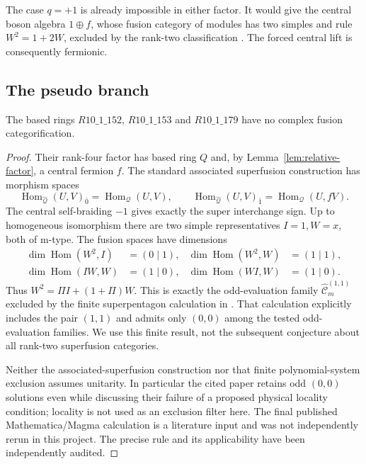 The case $q=+1$ is already impossible in either factor. It would give
the central boson algebra $1\oplus f$, whose fusion category of modules
has two simples and rule $W^2=1+2W$, excluded by the rank-two
classification \cite{Ostrik2}. The forced central lift is consequently
fermionic.

\subsection{The pseudo branch}
\begin{theorem}
The based rings $R10\_1\_152$, $R10\_1\_153$ and $R10\_1\_179$
have no complex fusion categorification.
\end{theorem}
\begin{proof}
Their rank-four factor has based ring $Q$ and, by
Lemma~\ref{lem:relative-factor}, a central fermion $f$. The standard
associated superfusion construction \cite[Definition~4.9]{Usher}
has morphism spaces
\[
 \operatorname{Hom}_{\widehat{\mathcal Q}}(U,V)_{\bar0}
 =\operatorname{Hom}_{\mathcal Q}(U,V),\qquad
 \operatorname{Hom}_{\widehat{\mathcal Q}}(U,V)_{\bar1}
 =\operatorname{Hom}_{\mathcal Q}(U,fV).
\]
The central self-braiding $-1$ gives exactly the super interchange sign.
Up to homogeneous isomorphism there are two simple representatives
$I=1,W=x$, both of m-type. The fusion spaces have dimensions
\begin{align*}
 \dim\operatorname{Hom}(W^2,I)&=(0\mid1),&
 \dim\operatorname{Hom}(W^2,W)&=(1\mid1),\\
 \dim\operatorname{Hom}(IW,W)&=(1\mid0),&
 \dim\operatorname{Hom}(WI,W)&=(1\mid0).
\end{align*}
Thus $W^2=\Pi I+(1+\Pi)W$. This is exactly the odd-evaluation family
$\widehat{\mathcal C}^{(1,1)}_m$ excluded by the finite superpentagon
calculation in \cite[Section~3]{CCX}. That calculation explicitly
includes the pair $(1,1)$ and admits only $(0,0)$ among the tested
odd-evaluation families. We use this finite result, not the subsequent
conjecture about all rank-two superfusion categories.

Neither the associated-superfusion construction nor that finite
polynomial-system exclusion assumes unitarity. In particular the cited
paper retains odd $(0,0)$ solutions even while discussing their failure
of a proposed physical locality condition; locality is not used as an
exclusion filter here. The final published Mathematica/Magma calculation
is a literature input and was not independently rerun in this project.
The precise rule and its applicability have been independently audited.
\end{proof}

